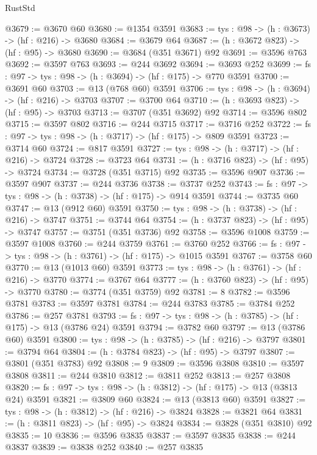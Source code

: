 \begin{lexlean}{RustStd}
\begin{coremodule}
@3679 := @3670 @60
@3680 := @1354 @3591
@3683 := {tys : @98} -> (h : @3673) -> (hf : @216) -> @3680
@3684 := @3679 @64
@3687 := (h : @3672 @823) -> (hf : @95) -> @3680
@3690 := @3684 (@351 @3671) @92
@3691 := @3596 @763
@3692 := @3597 @763
@3693 := @244 @3692
@3694 := @3693 @252
@3699 := {fs : @97} -> {tys : @98} -> (h : @3694) -> (hf : @175) -> @770 @3591
@3700 := @3691 @60
@3703 := @13 (@768 @60) @3591
@3706 := {tys : @98} -> (h : @3694) -> (hf : @216) -> @3703
@3707 := @3700 @64
@3710 := (h : @3693 @823) -> (hf : @95) -> @3703
@3713 := @3707 (@351 @3692) @92
@3714 := @3596 @802
@3715 := @3597 @802
@3716 := @244 @3715
@3717 := @3716 @252
@3722 := {fs : @97} -> {tys : @98} -> (h : @3717) -> (hf : @175) -> @809 @3591
@3723 := @3714 @60
@3724 := @817 @3591
@3727 := {tys : @98} -> (h : @3717) -> (hf : @216) -> @3724
@3728 := @3723 @64
@3731 := (h : @3716 @823) -> (hf : @95) -> @3724
@3734 := @3728 (@351 @3715) @92
@3735 := @3596 @907
@3736 := @3597 @907
@3737 := @244 @3736
@3738 := @3737 @252
@3743 := {fs : @97} -> {tys : @98} -> (h : @3738) -> (hf : @175) -> @914 @3591
@3744 := @3735 @60
@3747 := @13 (@912 @60) @3591
@3750 := {tys : @98} -> (h : @3738) -> (hf : @216) -> @3747
@3751 := @3744 @64
@3754 := (h : @3737 @823) -> (hf : @95) -> @3747
@3757 := @3751 (@351 @3736) @92
@3758 := @3596 @1008
@3759 := @3597 @1008
@3760 := @244 @3759
@3761 := @3760 @252
@3766 := {fs : @97} -> {tys : @98} -> (h : @3761) -> (hf : @175) -> @1015 @3591
@3767 := @3758 @60
@3770 := @13 (@1013 @60) @3591
@3773 := {tys : @98} -> (h : @3761) -> (hf : @216) -> @3770
@3774 := @3767 @64
@3777 := (h : @3760 @823) -> (hf : @95) -> @3770
@3780 := @3774 (@351 @3759) @92
@3781 := 8
@3782 := @3596 @3781
@3783 := @3597 @3781
@3784 := @244 @3783
@3785 := @3784 @252
@3786 := @257 @3781
@3793 := {fs : @97} -> {tys : @98} -> (h : @3785) -> (hf : @175) -> @13 (@3786 @24) @3591
@3794 := @3782 @60
@3797 := @13 (@3786 @60) @3591
@3800 := {tys : @98} -> (h : @3785) -> (hf : @216) -> @3797
@3801 := @3794 @64
@3804 := (h : @3784 @823) -> (hf : @95) -> @3797
@3807 := @3801 (@351 @3783) @92
@3808 := 9
@3809 := @3596 @3808
@3810 := @3597 @3808
@3811 := @244 @3810
@3812 := @3811 @252
@3813 := @257 @3808
@3820 := {fs : @97} -> {tys : @98} -> (h : @3812) -> (hf : @175) -> @13 (@3813 @24) @3591
@3821 := @3809 @60
@3824 := @13 (@3813 @60) @3591
@3827 := {tys : @98} -> (h : @3812) -> (hf : @216) -> @3824
@3828 := @3821 @64
@3831 := (h : @3811 @823) -> (hf : @95) -> @3824
@3834 := @3828 (@351 @3810) @92
@3835 := 10
@3836 := @3596 @3835
@3837 := @3597 @3835
@3838 := @244 @3837
@3839 := @3838 @252
@3840 := @257 @3835

\end{coremodule}
\end{lexlean}

